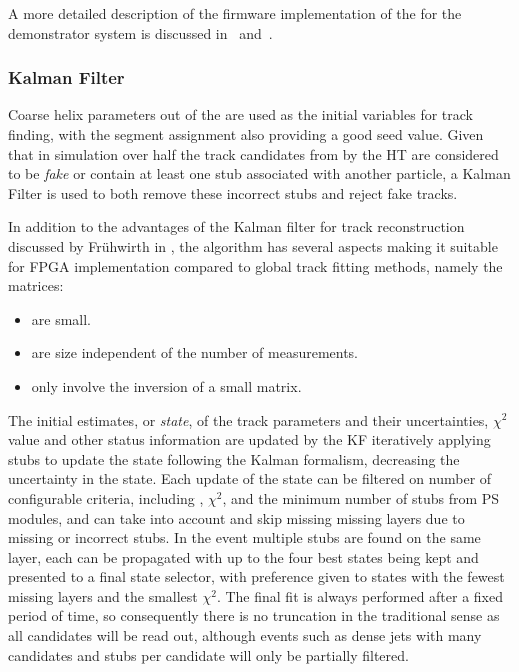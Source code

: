 A more detailed description of the firmware implementation of the \HT for the demonstrator system is discussed in~\cite{IEEE} and~\cite{TMTT_JINST}.

\subsubsection{Kalman Filter}
Coarse \rphi helix parameters out of the \HT are used as the initial variables for track finding, with the segment assignment also providing a good seed value.
Given that in simulation over half the track candidates from by the HT are considered to be \textit{fake} or contain at least one stub associated with another particle, a Kalman Filter is used to both remove these incorrect stubs and reject fake tracks. 

In addition to the advantages of the Kalman filter for track reconstruction discussed by Fr{\"u}hwirth in \cite{Fruhwirth:1987fm}, the algorithm has several aspects making it suitable for FPGA implementation compared to global track fitting methods, namely the matrices:

\begin{itemize}
\item {are small.}
\item {are size independent of the number of measurements.}
\item {only involve the inversion of a small matrix.}
\end{itemize}

The initial estimates, or \textit{state}, of the track parameters and their uncertainties, $\chi^2$ value and other status information are updated by the KF iteratively applying stubs to update the state following the Kalman formalism, decreasing the uncertainty in the state. 
Each update of the state can be filtered on number of configurable criteria, including \pT, $\chi^2$, and the minimum number of stubs from PS modules, and can take into account and skip missing missing layers due to missing or incorrect stubs.
In the event multiple stubs are found on the same layer, each can be propagated with up to the four best states being kept and presented to a final state selector, with preference given to states with the fewest missing layers and the smallest $\chi^2$.
The final fit is always performed after a fixed period of time, so consequently there is no truncation in the traditional sense as all candidates will be read out, although events such as dense jets with many candidates and stubs per candidate will only be partially filtered.


